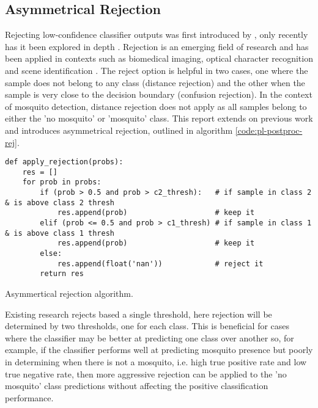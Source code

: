    \subsection{Asymmetrical Rejection}
    \label{subsec:pl-postproc-rej}
        Rejecting low-confidence classifier outputs was first introduced by \textcite{Chow1970}, only recently has it been explored in depth \cite{SajjadAhmedNadeem,Condessa2017}. Rejection is an emerging field of research and has been applied in contexts such as biomedical imaging, optical character recognition and scene identification \cite{Condessa2017}. The reject option is helpful in two cases, one where the sample does not belong to any class (distance rejection) and the other when the sample is very close to the decision boundary (confusion rejection). In the context of mosquito detection, distance rejection does not apply as all samples belong to either the 'no mosquito' or 'mosquito' class. This report extends on previous work and introduces asymmetrical rejection, outlined in algorithm \ref{code:pl-postproc-rej}.
        \begin{listing}[ht]
            \begin{verbatim}
def apply_rejection(probs):
    res = []
    for prob in probs:
        if (prob > 0.5 and prob > c2_thresh):   # if sample in class 2 & is above class 2 thresh
            res.append(prob)                    # keep it
        elif (prob <= 0.5 and prob > c1_thresh) # if sample in class 1 & is above class 1 thresh
            res.append(prob)                    # keep it
        else:
            res.append(float('nan'))            # reject it
        return res
            \end{verbatim}
            \caption{Asymmertical rejection algorithm.}
            \label{code:pl-postproc-rej}
        \end{listing} 
        Existing research rejects based a single threshold, here rejection will be determined by two thresholds, one for each class. This is beneficial for cases where the classifier may be better at predicting one class over another so, for example, if the classifier performs well at predicting mosquito presence but poorly in determining when there is not a mosquito, i.e. high true positive rate and low true negative rate, then more aggressive rejection can be applied to the 'no mosquito' class predictions without affecting the positive classification performance.
        
